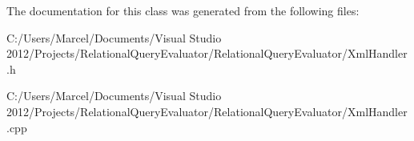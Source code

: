 The documentation for this class was generated from the following files\+:\begin{DoxyCompactItemize}
\item 
C\+:/\+Users/\+Marcel/\+Documents/\+Visual Studio 2012/\+Projects/\+Relational\+Query\+Evaluator/\+Relational\+Query\+Evaluator/Xml\+Handler.\+h\item 
C\+:/\+Users/\+Marcel/\+Documents/\+Visual Studio 2012/\+Projects/\+Relational\+Query\+Evaluator/\+Relational\+Query\+Evaluator/Xml\+Handler.\+cpp\end{DoxyCompactItemize}
